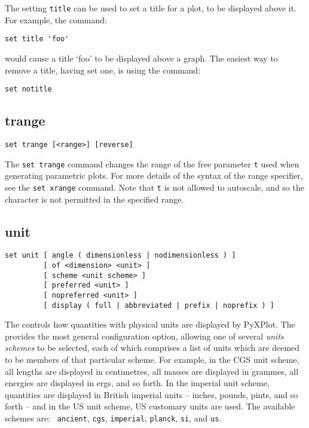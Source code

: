 The setting {\tt title} can be used to set a title for a plot, to be displayed
above it.  For example, the command:

\begin{verbatim}
set title 'foo'
\end{verbatim}

\noindent would cause a title `foo' to be displayed above a graph. The easiest
way to remove a title, having set one, is using the command:

\begin{verbatim}
set notitle
\end{verbatim}


\subsection{trange}

\begin{verbatim}
set trange [<range>] [reverse]
\end{verbatim}

The {\tt set trange} command changes the range of the free parameter {\tt t}
used when generating parametric plots.  For more details of the syntax of the
range specifier, see the {\tt set xrange} command. Note that {\tt t} is not
allowed to autoscale, and so the {\tt *} character is not permitted in the
specified range.

\subsection{unit}

\begin{verbatim}
set unit [ angle ( dimensionless | nodimensionless ) ]
         [ of <dimension> <unit> ]
         [ scheme <unit scheme> ]
         [ preferred <unit> ]
         [ nopreferred <unit> ]
         [ display ( full | abbreviated | prefix | noprefix ) ]
\end{verbatim}

The  controls how quantities with physical units are
displayed by PyXPlot. The  provides the most general
configuration option, allowing one of several {\it units
schemes} to be selected, each of which comprises a
list of units which are deemed to be members of that particular scheme. For
example, in the CGS unit scheme, all lengths
are displayed in centimetres, all masses are displayed in grammes, all energies
are displayed in ergs, and so forth.  In the imperial unit
scheme, quantities are displayed in
British imperial units -- inches, pounds, pints, and so forth -- and in the US
unit scheme, US customary units are used. The available schemes are: {\tt
ancient}, {\tt cgs}, {\tt imperial}, {\tt planck}, {\tt si}, and {\tt us}.

